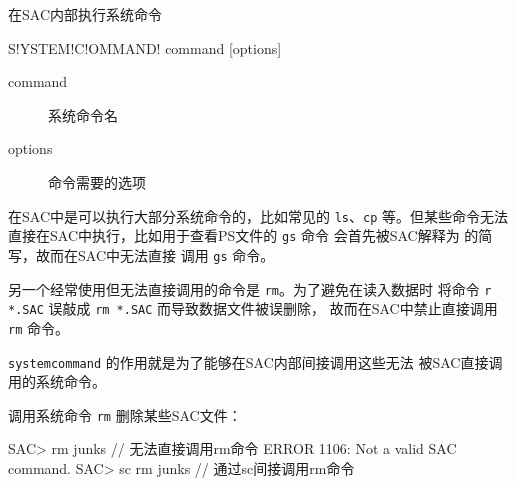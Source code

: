 \label{cmd:systemcommand}

在SAC内部执行系统命令

\begin{SACSTX}
S!YSTEM!C!OMMAND! command [options]
\end{SACSTX}

\begin{description}
\item [command] 系统命令名
\item [options] 命令需要的选项
\end{description}

在SAC中是可以执行大部分系统命令的，比如常见的 \texttt{ls}、\texttt{cp}
等。但某些命令无法直接在SAC中执行，比如用于查看PS文件的 \texttt{gs} 命令
会首先被SAC解释为  的简写，故而在SAC中无法直接
调用 \texttt{gs} 命令。

另一个经常使用但无法直接调用的命令是 \texttt{rm}。为了避免在读入数据时
将命令 \texttt{r *.SAC} 误敲成 \texttt{rm *.SAC} 而导致数据文件被误删除，
故而在SAC中禁止直接调用 \texttt{rm} 命令。

\texttt{systemcommand} 的作用就是为了能够在SAC内部间接调用这些无法
被SAC直接调用的系统命令。

调用系统命令 \texttt{rm} 删除某些SAC文件：
\begin{SACCode}
SAC> rm junks           // 无法直接调用rm命令
 ERROR 1106: Not a valid SAC command.
SAC> sc rm junks        // 通过sc间接调用rm命令
\end{SACCode}
